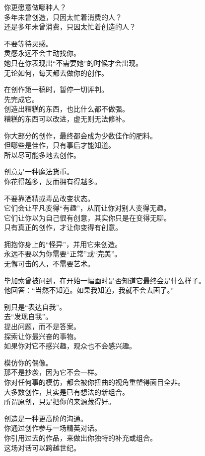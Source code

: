 \documentclass[
]{article}
\begin{document}
你更愿意做哪种人？\\
多年未曾创造，只因太忙着消费的人？\\
还是多年未曾消费，只因太忙着创造的人？

不要等待灵感。\\
灵感永远不会主动找你。\\
她只在你表现出``不需要她''的时候才会出现。\\
无论如何，每天都去做你的创作。

在创作第一稿时，暂停一切评判。\\
先完成它。\\
创造出糟糕的东西，也比什么都不做强。\\
糟糕的东西可以改进，虚无则无法修补。

你大部分的创作，最终都会成为少数佳作的肥料。\\
但哪些是佳作，只有事后才能知道。\\
所以尽可能多地去创作。

创意是一种魔法货币。\\
你花得越多，反而拥有得越多。

不要靠酒精或毒品改变状态。\\
它们会让平凡变得``有趣''，从而让你对别人变得无趣。\\
它们让你以为自己很有创意，其实你只是在变得无聊。\\
只有真正的创作，才让你变得有创意。

拥抱你身上的``怪异''，并用它来创造。\\
永远不要以为你需要``正常''或``完美''。\\
无懈可击的人，不需要艺术。

毕加索曾被问到，在开始一幅画时是否知道它最终会是什么样子。\\
他回答：``当然不知道。如果我知道，我就不会去画了。''

别只是``表达自我''。\\
去``发现自我''。\\
提出问题，而不是答案。\\
探索让你最兴奋的事物。\\
如果你对它不感兴趣，观众也不会感兴趣。

模仿你的偶像。\\
那不是抄袭，因为它不会一样。\\
你对任何事的模仿，都会被你扭曲的视角重塑得面目全非。\\
大多数创作，其实是已有想法的新组合。\\
所谓原创，只是把你的来源藏得好。

创造是一种更高阶的沟通。\\
你通过创作参与一场精英对话。\\
你引用过去的作品，来做出你独特的补充或组合。\\
这场对话可以跨越世纪。
\end{document}
